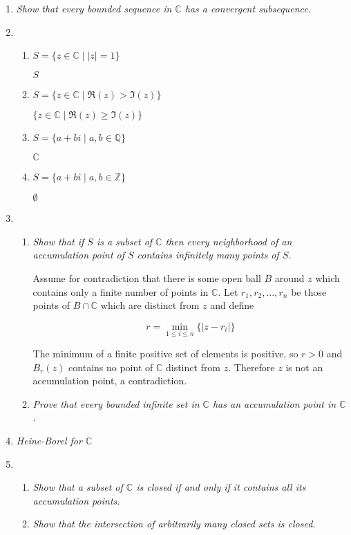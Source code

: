 \documentclass[11pt]{article}
\begin{document}
\begin{enumerate}
\item \emph{Show that every bounded sequence in $\mathbb{C}$ has a convergent subsequence.}

\item
\begin{enumerate}
\item \emph{$S = \{z \in \mathbb{C} \mid |z|=1 \}$}

$S$

\item \emph{$S = \{z \in \mathbb{C} \mid \Re(z) > \Im(z)\}$}

$\{z \in \mathbb{C} \mid \Re(z) \geq \Im(z)\}$

\item \emph{$S = \{a+bi \mid a,b \in \mathbb{Q} \}$}

$\mathbb{C}$

\item \emph{$S = \{a+bi \mid a,b \in \mathbb{Z} \}$}

$\emptyset$

\end{enumerate}

\item
\begin{enumerate}
\item \emph{Show that if $S$ is a subset of $\mathbb{C}$ then every neighborhood of an accumulation point of $S$ contains infinitely many points of $S$.}

Assume for contradiction that there is some open ball $B$ around $z$ which contains only a finite number of points in $\mathbb{C}$.  Let $r_1,r_2,\ldots,r_n$ be those points of $B \cap \mathbb{C}$ which are distinct from $z$ and define 

 \[ r = \min_{1 \leq i \leq n}\{|z - r_i|\}\]

The minimum of a finite positive set of elements is positive, so $r > 0$ and $B_r(z)$ contains no point of $\mathbb{C}$ distinct from $z$.  Therefore $z$ is not an accumulation point, a contradiction.

\item \emph{Prove that every bounded infinite set in $\mathbb{C}$ has an accumulation point in $\mathbb{C}$.}
\end{enumerate}

\item \emph{Heine-Borel for $\mathbb{C}$}

\item 
\begin{enumerate}
\item \emph{Show that a subset of $\mathbb{C}$ is closed if and only if it contains all its accumulation points.}
\item \emph{Show that the intersection of arbitrarily many closed sets is closed.}


\end{enumerate}
\end{enumerate}
\end{document}
